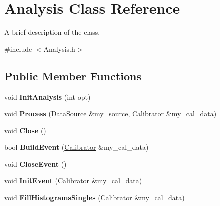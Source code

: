 \hypertarget{classAnalysis}{\section{Analysis Class Reference}
\label{classAnalysis}
}


A brief description of the class.  




{\ttfamily \#include $<$Analysis.\-h$>$}

\subsection*{Public Member Functions}
\begin{DoxyCompactItemize}
\item 
\hypertarget{classAnalysis_a88fe5552815cc257f3acd801e46c7046}{void {\bfseries Init\-Analysis} (int opt)}\label{classAnalysis_a88fe5552815cc257f3acd801e46c7046}

\item 
\hypertarget{classAnalysis_afae21198450b4b553a1a7750b4644659}{void {\bfseries Process} (\hyperlink{classDataSource}{Data\-Source} \&my\-\_\-source, \hyperlink{classCalibrator}{Calibrator} \&my\-\_\-cal\-\_\-data)}\label{classAnalysis_afae21198450b4b553a1a7750b4644659}

\item 
\hypertarget{classAnalysis_a8f737475bbb30bc543f3b5c920072876}{void {\bfseries Close} ()}\label{classAnalysis_a8f737475bbb30bc543f3b5c920072876}

\item 
\hypertarget{classAnalysis_af920e254681982b5ff2a8062a66b10fb}{bool {\bfseries Build\-Event} (\hyperlink{classCalibrator}{Calibrator} \&my\-\_\-cal\-\_\-data)}\label{classAnalysis_af920e254681982b5ff2a8062a66b10fb}

\item 
\hypertarget{classAnalysis_a5bad79058d6d56097d7f6be84372da87}{void {\bfseries Close\-Event} ()}\label{classAnalysis_a5bad79058d6d56097d7f6be84372da87}

\item 
\hypertarget{classAnalysis_a6756b25d7564dfe09920293295d542e5}{void {\bfseries Init\-Event} (\hyperlink{classCalibrator}{Calibrator} \&my\-\_\-cal\-\_\-data)}\label{classAnalysis_a6756b25d7564dfe09920293295d542e5}

\item 
\hypertarget{classAnalysis_a770471b4eaadf5e8b68f1d9231d2a51f}{void {\bfseries Fill\-Histograms\-Singles} (\hyperlink{classCalibrator}{Calibrator} \&my\-\_\-cal\-\_\-data)}\label{classAnalysis_a770471b4eaadf5e8b68f1d9231d2a51f}


\end{DoxyCompactItemize}
